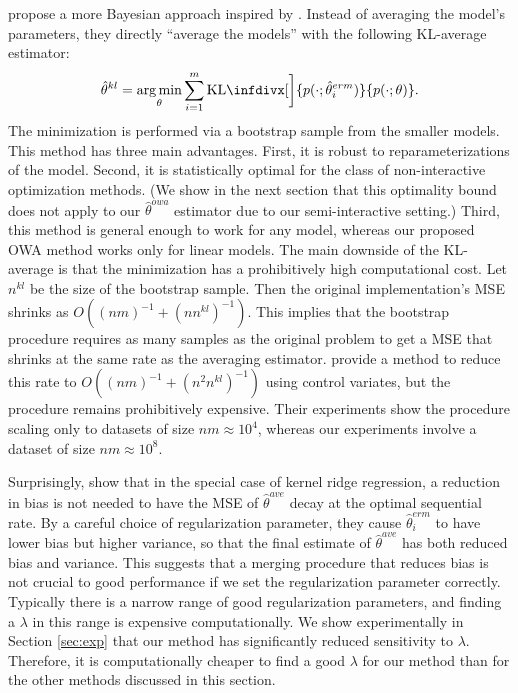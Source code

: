 \documentclass[twoside]{article}
\DeclareMathOperator*{\argmin}{arg\,min}
\newcommand{\w}{\theta}
\newcommand{\wkl}{\hat\w^{kl}}
\newcommand{\wowa}{\hat\w^{owa}}
\newcommand{\wave}{\hat\w^{ave}}
\newcommand{\wmle}{\hat\w^{erm}}
\newcommand{\kl}{\text{KL}\infdivx}
\begin{document}
\citet{liu2014distributed} propose a more Bayesian approach inspired by \citet{merugu2003privacy}.
Instead of averaging the model's parameters,
they directly ``average the models'' with the following KL-average estimator:
\begin{equation}
\wkl = \argmin_\w \sum_{i=1}^m \kl[\bigg]{p(\cdot;\wmle_i)}{p(\cdot;\w)}
.
\end{equation}
The minimization is performed via a bootstrap sample from the smaller models.
This method has three main advantages.
First, it is robust to reparameterizations of the model.
Second, it is statistically optimal for the class of non-interactive optimization methods.
(We show in the next section that this optimality bound does not apply to our $\wowa$ estimator due to our semi-interactive setting.)
Third, this method is general enough to work for any model,
whereas our proposed OWA method works only for linear models.
The main downside of the KL-average is that the minimization has a prohibitively high computational cost.
Let $n^{kl}$ be the size of the bootstrap sample.
Then the original implementation's MSE shrinks as $O((nm)^{-1}+(nn^{kl})^{-1})$.
This implies that the bootstrap procedure requires as many samples as the original problem to get a MSE that shrinks at the same rate as the averaging estimator.
\citet{han2016bootstrap} provide a method to reduce this rate to $O((nm)^{-1}+(n^2n^{kl})^{-1})$ using control variates, but the procedure remains prohibitively expensive.
Their experiments show the procedure scaling only to datasets of size $nm\approx10^4$,
whereas our experiments involve a dataset of size $nm\approx10^8$.

Surprisingly, \citet{zhang2013divide} show that in the special case of kernel ridge regression,
a reduction in bias is not needed to have the MSE of $\wave$ decay at the optimal sequential rate.
By a careful choice of regularization parameter,
they cause $\wmle_i$ to have lower bias but higher variance,
so that the final estimate of $\wave$ has both reduced bias and variance.
This suggests that a merging procedure that reduces bias is not crucial to good performance if we set the regularization parameter correctly.
Typically there is a narrow range of good regularization parameters,
and finding a $\lambda$ in this range is expensive computationally.
We show experimentally in Section \ref{sec:exp} that our method has significantly reduced sensitivity to $\lambda$.
Therefore, it is computationally cheaper to find a good $\lambda$ for our method than for the other methods discussed in this section.
\end{document}
